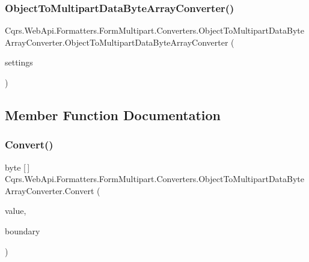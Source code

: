 \subsubsection{\texorpdfstring{Object\+To\+Multipart\+Data\+Byte\+Array\+Converter()}{ObjectToMultipartDataByteArrayConverter()}}
{\footnotesize\ttfamily Cqrs.\+Web\+Api.\+Formatters.\+Form\+Multipart.\+Converters.\+Object\+To\+Multipart\+Data\+Byte\+Array\+Converter.\+Object\+To\+Multipart\+Data\+Byte\+Array\+Converter (\begin{DoxyParamCaption}\item[{\hyperlink{classCqrs_1_1WebApi_1_1Formatters_1_1FormMultipart_1_1Infrastructure_1_1MultipartFormatterSettings}{Multipart\+Formatter\+Settings}}]{settings }\end{DoxyParamCaption})}



\subsection{Member Function Documentation}
\mbox{\label{classCqrs_1_1WebApi_1_1Formatters_1_1FormMultipart_1_1Converters_1_1ObjectToMultipartDataByteArrayConverter_af7bd8ac108a7e95f5961a14064595f84}} 
\subsubsection{\texorpdfstring{Convert()}{Convert()}}
{\footnotesize\ttfamily byte \mbox{[}$\,$\mbox{]} Cqrs.\+Web\+Api.\+Formatters.\+Form\+Multipart.\+Converters.\+Object\+To\+Multipart\+Data\+Byte\+Array\+Converter.\+Convert (\begin{DoxyParamCaption}\item[{object}]{value,  }\item[{string}]{boundary }\end{DoxyParamCaption})}

